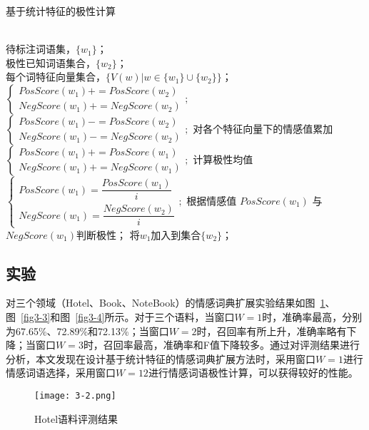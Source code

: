 \begin{algorithm}[htp]
\caption{基于统计特征的极性计算}
\label{alg3-2}
\begin{algorithmic}[1]
\REQUIRE ~~\\
待标注词语集，$\{w_1\}$；\\
极性已知词语集合，$\{w_2\}$；\\
每个词特征向量集合，$\{V(w)|w \in \{w_1\}\cup \{w_2\} \}$；
\STATE $
\begin{cases}
PosScore(w_1)+=PosScore(w_2)\\
NegScore(w_1)+=NegScore(w_2)
\end{cases};$
\ELSE
\STATE $
\begin{cases}
PosScore(w_1)-=PosScore(w_2)\\
NegScore(w_1)-=NegScore(w_2)
\end{cases};$
\ENDIF
\ENDFOR
\STATE 对各个特征向量下的情感值累加
\STATE $
\begin{cases}
PosScore(w_1)+=PosScore(w_1)\\
NegScore(w_1)+=NegScore(w_1)
\end{cases};$
\ENDFOR
\STATE 计算极性均值$
\begin{cases}
PosScore(w_1)=\dfrac{PosScore(w_1)}{i}\\
NegScore(w_1)=\dfrac{NegScore(w_2)}{i}
\end{cases};$
\STATE 根据情感值 $PosScore(w_1)$ 与$ NegScore(w_1) $判断极性；
\STATE 将$ w_1 $加入到集合$ \{w_2\} $；
\ENDFOR
\end{algorithmic}
\end{algorithm}

\subsection{实验}
对三个领域（Hotel、Book、NoteBook）的情感词典扩展实验结果如图~\ref{fig3-2}、图~\ref{fig3-3}和图~\ref{fig3-4}所示。对于三个语料，当窗口$W=1$时，准确率最高，分别为67.65\%、72.89\%和72.13\%；当窗口$W=2$时，召回率有所上升，准确率略有下降；当窗口$W=3$时，召回率最高，准确率和F值下降较多。通过对评测结果进行分析，本文发现在设计基于统计特征的情感词典扩展方法时，采用窗口$W=1$进行情感词语选择，采用窗口$W=12$进行情感词语极性计算，可以获得较好的性能。

\begin{figure}[htp]
\centering
\texttt{[image: 3-2.png]}
\caption{Hotel语料评测结果}
\label{fig3-2}
\end{figure}


